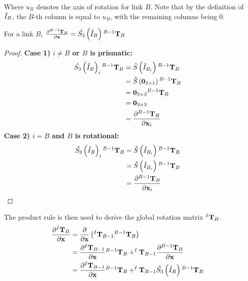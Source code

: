 \noindent Where $u_B$ denotes the axis of rotation for link $B$. Note that by the definition of $\hat{I}_B$, the $B$-th column is equal to $u_B$, with the remaining columns being 0. 
\begin{lemma} \label{lem:d_s_rot}
For a link $B$, $\frac{\partial {^{B-1}\mathbf{T}_B}}{\partial {\mathbf{{x}}}} = \mathring{S_3}\left(\hat{I}_B\right){^{B-1}\mathbf{T}_{B}}$
\begin{proof}
\noindent \textbf{Case 1) $i \ne B$ or $B$ is prismatic:}
\begin{align*}
    \mathring{S_3}\left(\hat{I}_B\right)_i{^{B-1}\mathbf{T}_{B}} &= \mathring{S}\left({\hat{I}_{B_i}}\right){^{B-1}\mathbf{T}_{B}} \\
    &= \mathring{S}\left({\mathbf{0}}_{3 \times 1}\right){^{B-1}\mathbf{T}_{B}} \\
    &= {{\mathbf{0}}_{3 \times 3}}{^{B-1}\mathbf{T}_{B}} \\
    &= {{\mathbf{0}}_{3 \times 3}}\\
    &= \frac{\partial {^{B-1}\mathbf{T}_B}}{\partial {\mathbf{{x}}}_i}
\end{align*}
\noindent \textbf{Case 2) $i = B$ and $B$ is rotational:} 
\begin{align*}
    \mathring{S_3}\left(\hat{I}_B\right)_i{^{B-1}\mathbf{T}_{B}} &= \mathring{S}\left({\hat{I}_{B_i}}\right){^{B-1}\mathbf{T}_{B}} \\
    &= \mathring{S}\left({\hat{I}_{B_i}}\right){^{B-1}\mathbf{T}_{B}} \\
    &= \frac{\partial {^{B-1}\mathbf{T}_B}}{\partial {\mathbf{{x}}}_i}
\end{align*}
\end{proof}
\end{lemma}
\noindent The product rule is then used to derive the global rotation matrix ${^I\mathbf{T}_B}$.
\begin{align}\nonumber
\frac{\partial{^I\mathbf{T}_B}}{\partial{\mathbf{{x}}}} &= \frac{\partial}{\partial{\mathbf{{x}}}}\left (^I\mathbf{T}_{B-1}{^{B-1}\mathbf{T}}_B \right ) \\ \nonumber
                    &= \frac{\partial^I\mathbf{T}_{B-1}}{\partial{\mathbf{{x}}}} {^{B-1}\mathbf{T}}_B + ^I\mathbf{T}_{B-1}\frac{\partial{^{B-1}\mathbf{T}}_B}{\partial{\mathbf{{x}}}} \\ \label{eqn:d_itb}
                    &= \frac{\partial^I\mathbf{T}_{B-1}}{\partial{\mathbf{{x}}}} {^{B-1}\mathbf{T}}_B + ^I\mathbf{T}_{B-1}\mathring{S_3}\left(\hat{I}_B\right){^{B-1}\mathbf{T}_{B}}
\end{align}

